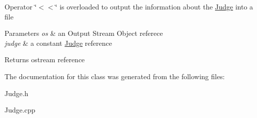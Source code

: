 Operator \char`\"{}$<$$<$\char`\"{} is overloaded to output the information about the \hyperlink{class_judge}{Judge} into a file 
\begin{DoxyParams}{Parameters}
{\em os} & an Output Stream Object referece \\
\hline
{\em judge} & a constant \hyperlink{class_judge}{Judge} reference \\
\hline
\end{DoxyParams}
\begin{DoxyReturn}{Returns}
ostream reference 
\end{DoxyReturn}


The documentation for this class was generated from the following files\+:\begin{DoxyCompactItemize}
\item 
Judge.\+h\item 
Judge.\+cpp\end{DoxyCompactItemize}
